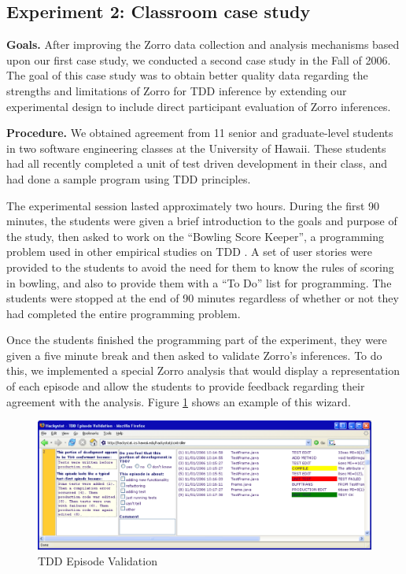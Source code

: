 \documentclass[smallextended]{svjour3}     %
\begin{document}
\subsection{Experiment 2: Classroom case study}

{\bf Goals.}  After improving the Zorro data collection and analysis
mechanisms based upon our first case study, we conducted a second case
study in the Fall of 2006.  The goal of this case study was to obtain
better quality data regarding the strengths and limitations of Zorro for
TDD inference by extending our experimental design to include direct
participant evaluation of Zorro inferences.

{\bf Procedure.}  We obtained agreement from 11 senior and graduate-level
students in two software engineering classes at the University of Hawaii.
These students had all recently completed a unit of test driven development
in their class, and had done a sample program using TDD principles.

The experimental session lasted approximately two hours. During the first
90 minutes, the students were given a brief introduction to the goals and
purpose of the study, then asked to work on the ``Bowling Score Keeper'', a
programming problem used in other empirical studies on TDD
\citep{George:03,Erdogmus:05}.  A set of user stories were provided to the
students to avoid the need for them to know the rules of scoring in
bowling, and also to provide them with a ``To Do'' list for programming.
The students were stopped at the end of 90 minutes regardless of whether or
not they had completed the entire programming problem.

Once the students finished the programming part of the experiment, they
were given a five minute break and then asked to validate Zorro's
inferences.  To do this, we implemented a special Zorro analysis that would
display a representation of each episode and allow the students to provide
feedback regarding their agreement with the analysis.  Figure
\ref{fig:EpisodeFeedback} shows an example of this wizard.

\begin{figure}[htbp]
  \centering
  \includegraphics[width=1.0\textwidth]{EpisodeFeedback}
  \caption{TDD Episode Validation}\label{fig:EpisodeFeedback}
\end{figure}
\end{document}
